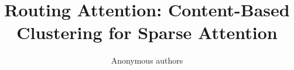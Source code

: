 \title{\textbf{Routing Attention: Content-Based Clustering for Sparse Attention}}

\author{Anonymous authors}
